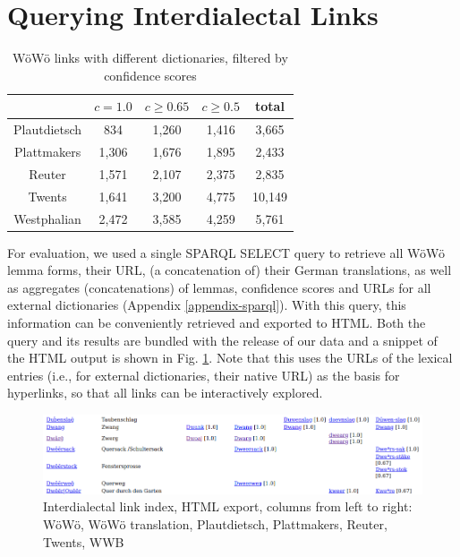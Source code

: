 \section{Querying Interdialectal Links}

\begin{table}
{\small
\begin{tabular}{ccccc}
                & $c=1.0$   & $c\geq 0.65$  & $c \geq 0.5$  & total \\ \hline
Plautdietsch    & 834       & 1,260          & 1,416          & 3,665 \\
Plattmakers     & 1,306     & 1,676          & 1,895          & 2,433 \\
Reuter          & 1,571     & 2,107          & 2,375          & 2,835 \\
Twents          & 1,641     & 3,200          & 4,775          & 10,149\\
Westphalian     & 2,472     & 3,585          & 4,259          & 5,761 \\
\hline
\end{tabular}
} %
\caption{WöWö links with different dictionaries, filtered by confidence scores}
\label{tab-results}
\end{table}

For evaluation, we used a single SPARQL SELECT query to retrieve all WöWö lemma forms, their URL, (a concatenation of) their German translations, as well as aggregates (concatenations) of lemmas, confidence scores and URLs for all external dictionaries (Appendix \ref{appendix-sparql}). With this query, this information can be conveniently retrieved and exported to HTML. Both the query and its results are bundled with the release of our data and a snippet of the HTML output is shown in Fig. \ref{fig-interdialectal-links-in-html}. Note that this uses the URLs of the lexical entries (i.e., for external dictionaries, their native URL) as the basis for hyperlinks, so that all links can be interactively explored.

\begin{figure}
    \centering
    \includegraphics[width=1\linewidth]{img/html.png}
    \caption{Interdialectal link index, HTML export, columns from left to right: WöWö, WöWö translation, Plautdietsch, Plattmakers, Reuter, Twents, WWB}
    \label{fig-interdialectal-links-in-html}
\end{figure}

